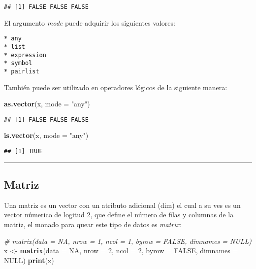 \documentclass[11pt,]{article}
\newenvironment{Shaded}{\begin{snugshade}}{\end{snugshade}}
\newcommand{\CommentTok}[1]{\textcolor[rgb]{0.56,0.35,0.01}{\textit{#1}}}
\newcommand{\DataTypeTok}[1]{\textcolor[rgb]{0.13,0.29,0.53}{#1}}
\newcommand{\DecValTok}[1]{\textcolor[rgb]{0.00,0.00,0.81}{#1}}
\newcommand{\KeywordTok}[1]{\textcolor[rgb]{0.13,0.29,0.53}{\textbf{#1}}}
\newcommand{\NormalTok}[1]{#1}
\newcommand{\OtherTok}[1]{\textcolor[rgb]{0.56,0.35,0.01}{#1}}
\newcommand{\StringTok}[1]{\textcolor[rgb]{0.31,0.60,0.02}{#1}}
\begin{document}
\begin{verbatim}
## [1] FALSE FALSE FALSE
\end{verbatim}

El argumento \emph{mode} puede adquirir los siguientes valores:

\begin{verbatim}
* any
* list
* expression
* symbol
* pairlist
\end{verbatim}

También puede ser utilizado en operadores lógicos de la siguiente
manera:

\begin{Shaded}
\begin{Highlighting}[]
\KeywordTok{as.vector}\NormalTok{(x, }\DataTypeTok{mode =} \StringTok{"any"}\NormalTok{)}
\end{Highlighting}
\end{Shaded}

\begin{verbatim}
## [1] FALSE FALSE FALSE
\end{verbatim}

\begin{Shaded}
\begin{Highlighting}[]
\KeywordTok{is.vector}\NormalTok{(x, }\DataTypeTok{mode =} \StringTok{"any"}\NormalTok{)}
\end{Highlighting}
\end{Shaded}

\begin{verbatim}
## [1] TRUE
\end{verbatim}

\begin{center}\rule{0.5\linewidth}{0.5pt}\end{center}

\hypertarget{matriz}{%
\subsection{Matriz}\label{matriz}}

Una matriz es un vector con un atributo adicional (dim) el cual a su ves
es un vector númerico de logitud 2, que define el número de filas y
columnas de la matriz, el monado para quear este tipo de datos es
\emph{matrix}:

\begin{Shaded}
\begin{Highlighting}[]
\CommentTok{# matrix(data = NA, nrow = 1, ncol = 1, byrow = FALSE, dimnames = NULL)}
\NormalTok{x <-}\StringTok{ }\KeywordTok{matrix}\NormalTok{(}\DataTypeTok{data =} \OtherTok{NA}\NormalTok{, }\DataTypeTok{nrow =} \DecValTok{2}\NormalTok{, }\DataTypeTok{ncol =} \DecValTok{2}\NormalTok{, }\DataTypeTok{byrow =} \OtherTok{FALSE}\NormalTok{, }\DataTypeTok{dimnames =} \OtherTok{NULL}\NormalTok{)}
\KeywordTok{print}\NormalTok{(x)}
\end{Highlighting}
\end{Shaded}
\end{document}

